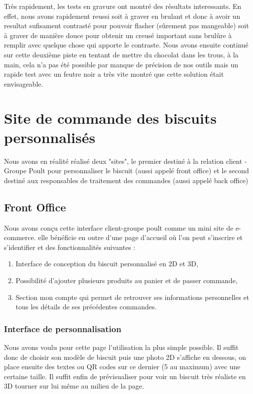 \documentclass[a4paper]{article}
\begin{document}
Très rapidement, les tests en gravure ont montré des résultats interessants. En effet, nous avons rapidement reussi soit à graver en brulant et donc à avoir un resultat sufisament contrasté pour pouvoir flasher (sûrement pas mangeable) soit à graver de manière douce pour obtenir un creusé important sans brulûre à remplir avec quelque chose qui apporte le contraste.
Nous avons ensuite continué sur cette deuxième piste en tentant de mettre du chocolat dans les trous, à la main, cela n'a pas été possible par manque de précision de nos outils mais un rapide test avec un feutre noir a très vite montré que cette solution était envisageable.


\section{Site de commande des biscuits personnalisés}

Nous avons en réalité réalisé deux "sites", le premier destiné à la relation client - Groupe Poult pour personnaliser le biscuit (aussi appelé front office) et le second destiné aux responsables de traitement des commandes (aussi appelé back office)

\subsection{Front Office}

Nous avons conçu cette interface client-groupe poult comme un mini site de e-commerce. elle bénéficie en outre d'une page d'accueil où l'on peut s'inscrire et s'identifier et des fonctionnalités suivantes :

\begin{enumerate}
\item Interface de conception du biscuit personnalisé en 2D et 3D,
\item Possibilité d'ajouter plusieurs produits au panier et de passer commande,
\item Section mon compte qui permet de retrouver ses informations personnelles et tous les détails de ses précédentes commandes. 
\end{enumerate}

\subsubsection{Interface de personnalisation}

Nous avons voulu pour cette page l'utilisation la plus simple possible. Il suffit donc de choisir son modèle de biscuit puis une photo 2D s'affiche en dessous, on place ensuite des textes ou QR codes sur ce dernier (5 au maximum) avec une certaine taille. Il suffit enfin de prévisualiser pour voir un biscuit très réaliste en 3D tourner sur lui même au milieu de la page.
\end{document}
